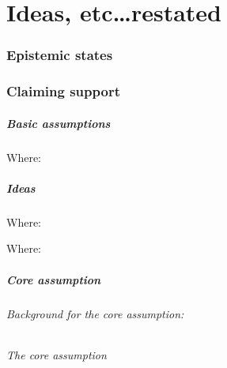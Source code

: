 \chapter{Ideas, etc\dots restated}
\label{cha:restatable}

\subsection{Epistemic states}


\subsection{Claiming support}

\paragraph{Basic assumptions}

\assuCSVP*

\assuCSRR*

\assuIndicate*

Where:


\paragraph{Ideas}

\iCSA*

Where:


\ideaEIS*

\iCSC*

Where:


\paragraph{Core assumption}

\subparagraph{Background for the core assumption: }

\ideaRequisite*






\subparagraph{The core assumption}

\assuCSRReq*


